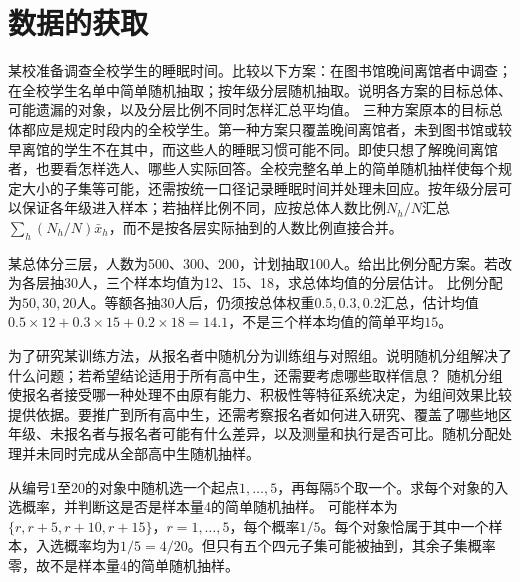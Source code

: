\par\addvspace{12pt}

\section{数据的获取}

某校准备调查全校学生的睡眠时间。比较以下方案：在图书馆晚间离馆者中调查；在全校学生名单中简单随机抽取；按年级分层随机抽取。说明各方案的目标总体、可能遗漏的对象，以及分层比例不同时怎样汇总平均值。
\solutionanswer
三种方案原本的目标总体都应是规定时段内的全校学生。第一种方案只覆盖晚间离馆者，未到图书馆或较早离馆的学生不在其中，而这些人的睡眠习惯可能不同。即使只想了解晚间离馆者，也要看怎样选人、哪些人实际回答。全校完整名单上的简单随机抽样使每个规定大小的子集等可能，还需按统一口径记录睡眠时间并处理未回应。按年级分层可以保证各年级进入样本；若抽样比例不同，应按总体人数比例\(N_h/N\)汇总\(\sum_h(N_h/N)\bar x_h\)，而不是按各层实际抽到的人数比例直接合并。


某总体分三层，人数为500、300、200，计划抽取100人。给出比例分配方案。若改为各层抽30人，三个样本均值为12、15、18，求总体均值的分层估计。
\solutionanswer
比例分配为\(50,30,20\)人。等额各抽30人后，仍须按总体权重\(0.5,0.3,0.2\)汇总，估计均值\(0.5\times12+0.3\times15+0.2\times18=14.1\)，不是三个样本均值的简单平均\(15\)。


为了研究某训练方法，从报名者中随机分为训练组与对照组。说明随机分组解决了什么问题；若希望结论适用于所有高中生，还需要考虑哪些取样信息？
\solutionanswer
随机分组使报名者接受哪一种处理不由原有能力、积极性等特征系统决定，为组间效果比较提供依据。要推广到所有高中生，还需考察报名者如何进入研究、覆盖了哪些地区年级、未报名者与报名者可能有什么差异，以及测量和执行是否可比。随机分配处理并未同时完成从全部高中生随机抽样。


从编号1至20的对象中随机选一个起点\(1,\ldots,5\)，再每隔5个取一个。求每个对象的入选概率，并判断这是否是样本量4的简单随机抽样。
\solutionanswer
可能样本为\(\{r,r+5,r+10,r+15\}\)，\(r=1,\ldots,5\)，每个概率\(1/5\)。每个对象恰属于其中一个样本，入选概率均为\(1/5=4/20\)。但只有五个四元子集可能被抽到，其余子集概率零，故不是样本量4的简单随机抽样。


